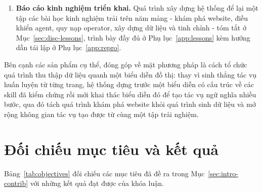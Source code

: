 \begin{enumerate}
  \item \textbf{Báo cáo kinh nghiệm triển khai.}
    Quá trình xây dựng hệ thống để lại một tập các bài học kinh nghiệm trải
    trên năm mảng - khám phá website, điều khiển agent, quy nạp operator, xây dựng
    dữ liệu và tinh chỉnh - tóm tắt ở Mục~\ref{sec:disc-lessons}, trình bày đầy
    đủ ở Phụ lục~\ref{app:lessons} kèm hướng dẫn tái lập ở
    Phụ lục~\ref{app:repro}.

\end{enumerate}

Bên cạnh các sản phẩm cụ thể, đóng góp về mặt phương pháp là cách tổ chức quá
trình thu thập dữ liệu quanh một biểu diễn đồ thị: thay vì sinh thẳng tác vụ
huấn luyện từ từng trang, hệ thống dựng trước một biểu diễn có cấu trúc về các
skill đã kiểm chứng rồi mới khai thác biểu diễn đó để tạo tác vụ ngữ nghĩa nhiều
bước, qua đó tách quá trình khám phá website khỏi quá trình sinh dữ liệu và mở
rộng không gian tác vụ tạo được từ cùng một tập trải nghiệm.

\section{Đối chiếu mục tiêu và kết quả}
\label{sec:conc-objectives}

Bảng~\ref{tab:objectives} đối chiếu các mục tiêu đã đề ra trong
Mục~\ref{sec:intro-contrib} với những kết quả đạt được của khóa luận.

